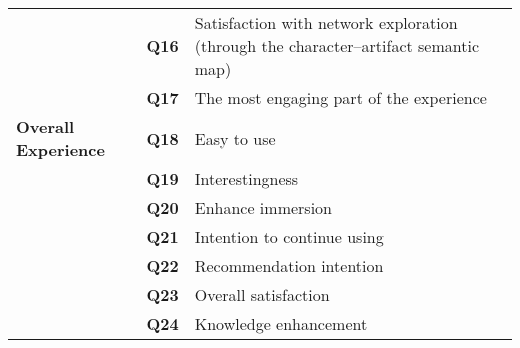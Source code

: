 \begin{table}[H]
\begin{tabular}{lll}
~ & \textbf{Q16} & Satisfaction with network exploration (through the character–artifact semantic map) \\
\vspace{0.5em}
~	& \textbf{Q17} & The most engaging part of the experience \\
\textbf{Overall Experience}	& \textbf{Q18} & Easy to use \\
~ & \textbf{Q19} & Interestingness \\
~ & \textbf{Q20} & Enhance immersion \\
~ & \textbf{Q21} & Intention to continue using \\
~ & \textbf{Q22} & Recommendation intention \\
~ & \textbf{Q23} & Overall satisfaction \\
~ & \textbf{Q24} & Knowledge enhancement \\
\bottomrule
\end{tabular}
\end{table}

\newpage
